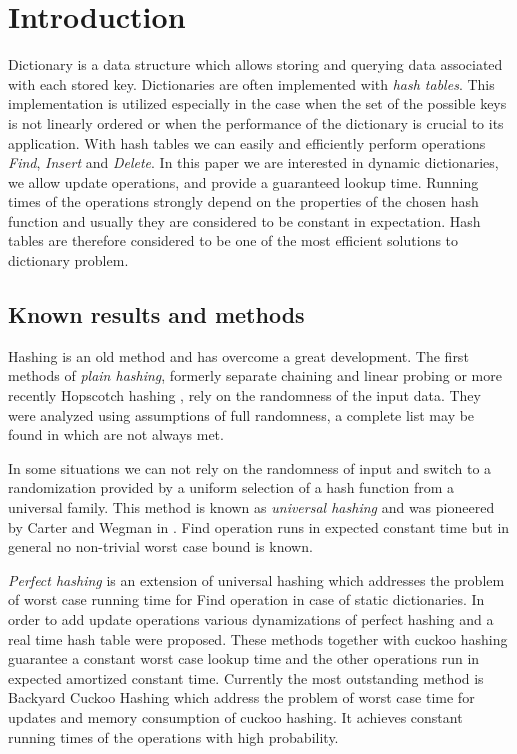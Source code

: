 \section{Introduction}
Dictionary is a data structure which allows storing and querying data associated with each stored key. 
Dictionaries are often implemented with \emph{hash tables}. 
This implementation is utilized especially in the case when the set of the possible keys is not linearly ordered or when the performance of the dictionary is crucial to its application.
With hash tables we can easily and efficiently perform operations \emph{Find}, \emph{Insert} and \emph{Delete}.
In this paper we are interested in dynamic dictionaries, we allow update operations, and provide a guaranteed lookup time.
Running times of the operations strongly depend on the properties of the chosen hash function and usually they are considered to be constant in expectation. 
Hash tables are therefore considered to be one of the most efficient solutions to dictionary problem.

\subsection{Known results and methods}
Hashing is an old method and has overcome a great development. 
The first methods of \emph{plain hashing}, formerly separate chaining and linear probing or more recently Hopscotch hashing \cite{DBLP:conf/wdag/HerlihyST08}, rely on the randomness of the input data. 
They were analyzed using assumptions of full randomness, a complete list may be found in \cite{DBLP:books/sp/Mehlhorn84} which are not always met.

In some situations we can not rely on the randomness of input and switch to a randomization provided by a uniform selection of a hash function from a universal family. 
This method is known as \emph{universal hashing} and was pioneered by Carter and Wegman in \cite{DBLP:journals/jcss/CarterW79}. 
Find operation runs in expected constant time but in general no non-trivial worst case bound is known.

\emph{Perfect hashing} \cite{Fredman:1984:SST:828.1884} is an extension of universal hashing which addresses the problem of worst case running time for Find operation in case of static dictionaries. 
In order to add update operations various dynamizations of perfect hashing \cite{DBLP:journals/siamcomp/DietzfelbingerKMHRT94} and a real time hash table \cite{DBLP:conf/icalp/DietzfelbingerH90} were proposed. 
These methods together with cuckoo hashing \cite{DBLP:conf/esa/PaghR01} guarantee a constant worst case lookup time and the other operations run in expected amortized constant time.
Currently the most outstanding method is Backyard Cuckoo Hashing \cite{DBLP:conf/focs/ArbitmanNS10} which address the problem of worst case time for updates and memory consumption of cuckoo hashing.
It achieves constant running times of the operations with high probability.

